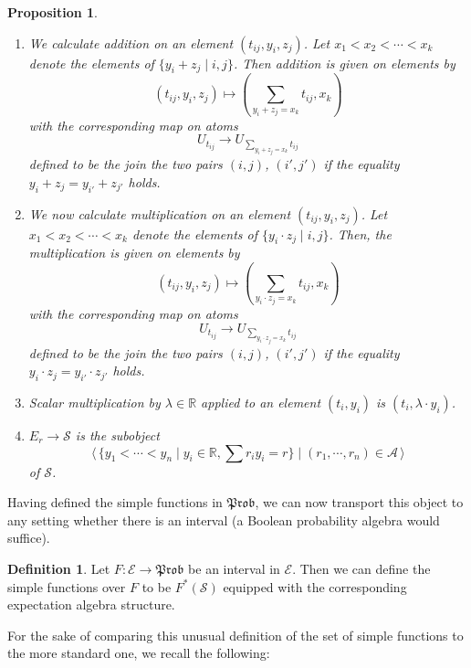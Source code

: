\documentclass[a4paper]{amsproc}
\theoremstyle{plain}
\newtheorem{proposition}[theorem]{Proposition}
\theoremstyle{definition}
\newtheorem{definition}[theorem]{Definition}
\theoremstyle{remark}
\numberwithin{equation}{section}
\newcommand{\Prob}{\mathfrak{Prob}}
\newcommand{\la}{\langle\,}
\newcommand{\ra}{\,\rangle}
\begin{document}
\begin{proposition} \label{operations}
    \begin{enumerate}
        \item We calculate addition on an element $(t_{ij}, y_i, z_j)$. Let $x_1 < x_2 < \cdots < x_k$ denote the elements of $\{y_i + z_j \mid i,j \}$. Then addition is given on elements by
        \[
            (t_{ij},y_i,z_j) \mapsto (\sum_{y_i + z_j = x_k} t_{ij}, x_k)
        \]
        with the corresponding map on atoms
        \[
            U_{t_{ij}} \to U_{\sum_{y_i + z_j = x_k} t_{ij}}
        \]
        defined to be the join the two pairs $(i,j)$, $(i',j')$ if the equality $y_i + z_j = y_{i'} + z_{j'}$ holds.
        \item We now calculate multiplication on an element $(t_{ij}, y_i, z_j)$. Let $x_1 < x_2 < \cdots < x_k$ denote the elements of $\{y_i \cdot z_j \mid i,j \}$. Then, the multiplication is given on elements by
        \[
            (t_{ij},y_i,z_j) \mapsto (\sum_{y_i \cdot z_j = x_k} t_{ij}, x_k)
        \]
        with the corresponding map on atoms
        \[
            U_{t_{ij}} \to U_{\sum_{y_i \cdot z_j = x_k} t_{ij}}
        \]
        defined to be the join the two pairs $(i,j)$, $(i',j')$ if the equality $y_i \cdot z_j = y_{i'} \cdot z_{j'}$ holds.
        \item Scalar multiplication by $\lambda \in \mathbb{R}$ applied to an element $(t_i,y_i)$ is $(t_i,\lambda \cdot y_i)$.
        \item $E_r \to \mathcal{S}$ is the subobject
        \[
            \la \{y_1 < \cdots < y_n \mid y_i \in \mathbb{R}, \sum r_i y_i = r \} \mid (r_1, \cdots, r_n) \in \mathcal{A} \ra
        \]
        of $\mathcal{S}$.
    \end{enumerate}
\end{proposition}

Having defined the simple functions in $\Prob$, we can now transport this object to any setting whether there is an interval (a Boolean probability algebra would suffice).

\begin{definition}
    Let $F: \mathcal{E} \to \Prob$ be an interval in $\mathcal{E}$. Then we can define the simple functions over $F$ to be $F^*(\mathcal{S})$ equipped with the corresponding expectation algebra structure.
\end{definition}

For the sake of comparing this unusual definition of the set of simple functions to the more standard one, we recall the following:
\end{document}
